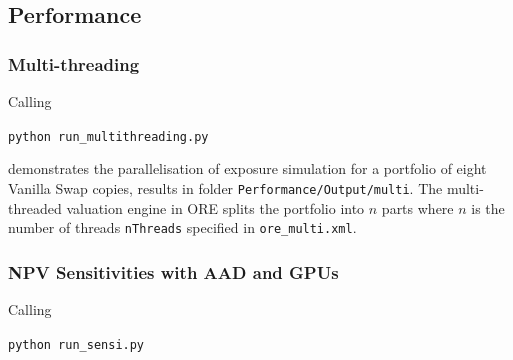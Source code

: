 \subsection{Performance}\label{example:performance}

\subsubsection{Multi-threading}

Calling
\medskip
\centerline {\tt python run\_multithreading.py} 

\medskip
demonstrates the parallelisation of exposure simulation for a portfolio of eight Vanilla Swap copies, results in folder
{\tt Performance/Output/multi}. The multi-threaded valuation engine in ORE splits the portfolio into $n$ parts where
$n$ is the number of threads {\tt nThreads} specified in {\tt ore\_multi.xml}.

\subsubsection{NPV Sensitivities with AAD and GPUs}

Calling
\medskip
\centerline {\tt python run\_sensi.py} 

